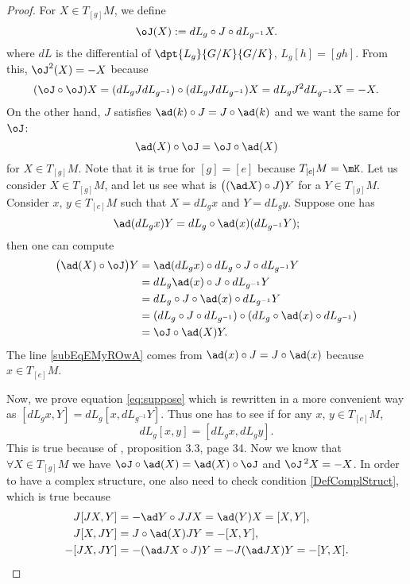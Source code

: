 \begin{proof} 
 For $X\in T_{[g]}M$, we define
\begin{equation} 
  \oJ(X):=dL_g\circ J\circ dL_{g^{-1}}X.
\end{equation}
where $dL$ is the differential of $\dpt{L_g}{G/K}{G/K}$, $L_g[h]=[gh]$.
From this, $\oJ^2(X)=-X$ because
\begin{equation}
  (\oJ\circ\oJ)X=( dL_g J dL_{g^{-1}} )\circ( dL_g J dL_{g^{-1}} )X
           =dL_g J^2dL_{g^{-1}}X
	   =-X.
\end{equation}
On the other hand, $J$ satisfies $\ad(k)\circ J=J\circ \ad(k)$ and we want the same for $\oJ$: 
\[
  \ad(X)\circ\oJ=\oJ\circ\ad(X) 
\]
for $X\in T_{[g]}M$. Note that it is true for $[g]=[e]$ because $T_{[e]}M=\mK$. Let us consider $X\in T_{[g]}M$, and let us see what is $ \big( (\ad X)\circ J \big)Y $ for a $Y\in T_{[g]}M$. Consider $x$, $y\in T_{[e]}M$ such that $X=dL_g x$ and $Y=dL_g y$. Suppose one has 
\begin{equation}\label{eq:suppose}
   \ad(dL_g x)Y=dL_g\circ\ad(x)(dL_{g^{-1}}Y);
\end{equation}
then one can compute
\begin{subequations}
    \begin{align}
\big(  \ad(X)\circ\oJ \big)Y&=\ad(dL_g x)\circ dL_g\circ J\circ dL_{g^{-1}}Y\\
&=dL_g\ad(x) \circ J\circ dL_{g^{-1}}Y\label{subEqEMyROwA}\\
	                    &=dL_g\circ J\circ\ad(x)\circ dL_{g^{-1}}Y\\
			    &=(dL_g\circ J\circ dL_{g^{-1}})\circ (dL_g\circ\ad(x)\circ dL_{g^{-1}})\\
			    &=\oJ\circ\ad(X)Y.
    \end{align}
\end{subequations}
The line \eqref{subEqEMyROwA} comes from $\ad(x)\circ J=J\circ\ad(x)$ because $x\in T_{[e]}M$.
 
Now, we prove equation \eqref{eq:suppose} which is rewritten in a more convenient way as $[dL_g x,Y]=dL_g[x,dL_{g^{-1}}Y]$. Thus one has to see if for any $x$, $y\in T_{[e]}M$, 
\[
   dL_g[x,y]=[dL_g x,dL_g y].
\]
This is true because of \cite{Helgason}, proposition 3.3, page 34.  Now we know that $\forall X\in T_{[g]}M$ we have $\oJ\circ\ad(X)=\ad(X)\circ\oJ$ and ${\oJ}\,^2X=-X$.  In order to have a complex structure, one also need to check condition \eqref{DefComplStruct}, which is true because
\begin{equation}
\begin{split}
J[JX,Y]&=-\ad Y\circ JJX=\ad(Y)X=[X,Y],\\
J[X,JY]&=J\circ\ad(X)JY=-[X,Y],\\
-[JX,JY]&=-(\ad JX\circ J)Y
        =-J(\ad JX)Y
	=-[Y,X].
\end{split}
\end{equation}

\end{proof}

